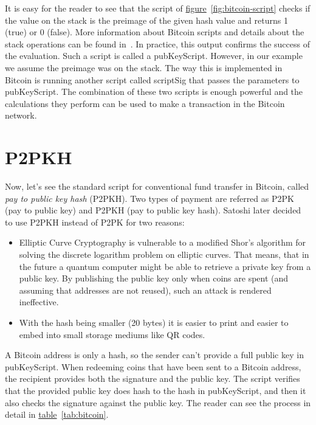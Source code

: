 It is easy for the reader to see that the script of \hyperref[fig:bitcoin-script]{figure}~\ref{fig:bitcoin-script} checks if the value on the stack is the preimage of the given hash value and returns 1 (true) or 0 (false). More information about Bitcoin scripts and details about the stack operations can be found in~\cite{wiki}. In practice, this output confirms the success of the evaluation. Such a script is called a \textsf{pubKeyScript}. However, in our example we assume the preimage was on the stack. The way this is implemented in Bitcoin is running another script called \textsf{scriptSig} that passes the parameters to \textsf{pubKeyScript}. The combination of these two scripts is enough powerful and the calculations they perform can be used to make a transaction in the Bitcoin network.

\section{P2PKH}
Now, let's see the standard script for conventional fund transfer in Bitcoin, called \emph{pay to public key hash} (P2PKH). Two types of payment are referred as P2PK (pay to public key) and P2PKH (pay to public key hash). Satoshi later decided to use P2PKH instead of P2PK for two reasons:

\begin{itemize}
  \item Elliptic Curve Cryptography is vulnerable to a modified Shor's algorithm for solving the discrete logarithm problem on elliptic curves. That means, that in the future a quantum computer might be able to retrieve a private key from a public key. By publishing the public key only when coins are spent (and assuming that addresses are not reused), such an attack is rendered ineffective.
  \item With the hash being smaller (20 bytes) it is easier to print and easier to embed into small storage mediums like QR codes.
\end{itemize}

A Bitcoin address is only a hash, so the sender can't provide a full public key in \textsf{pubKeyScript}. When redeeming coins that have been sent to a Bitcoin address, the recipient provides both the signature and the public key. The script verifies that the provided public key does hash to the hash in \textsf{pubKeyScript}, and then it also checks the signature against the public key. The reader can see the process in detail in \hyperref[tab:bitcoin]{table}~\ref{tab:bitcoin}.

